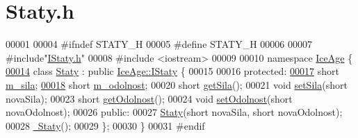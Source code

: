 \hypertarget{Staty_8h_source}{}\section{Staty.\+h}
\label{Staty_8h_source}

\begin{DoxyCode}
00001 
00004 \textcolor{preprocessor}{#ifndef STATY\_H}
00005 \textcolor{preprocessor}{#define STATY\_H}
00006 
00007 \textcolor{preprocessor}{#include"\hyperlink{IStaty_8h}{IStaty.h}"}
00008 \textcolor{preprocessor}{#include <iostream>}
00009 
00010 \textcolor{keyword}{namespace }\hyperlink{namespaceIceAge}{IceAge} \{
\hypertarget{Staty_8h_source.tex_l00014}{}\hyperlink{classIceAge_1_1Staty}{00014}     \textcolor{keyword}{class }\hyperlink{classIceAge_1_1Staty}{Staty} : \textcolor{keyword}{public} \hyperlink{classIceAge_1_1IStaty}{IceAge::IStaty} \{
00015 
00016     \textcolor{keyword}{protected}:
\hypertarget{Staty_8h_source.tex_l00017}{}\hyperlink{classIceAge_1_1Staty_a9ff580be9af5b83c9a26cbb031a39cce}{00017}         \textcolor{keywordtype}{short} \hyperlink{classIceAge_1_1Staty_a9ff580be9af5b83c9a26cbb031a39cce}{m\_sila};
\hypertarget{Staty_8h_source.tex_l00018}{}\hyperlink{classIceAge_1_1Staty_a71017d01cdc77192c6f70946b25a74e8}{00018}         \textcolor{keywordtype}{short} \hyperlink{classIceAge_1_1Staty_a71017d01cdc77192c6f70946b25a74e8}{m\_odolnost};
00020         \textcolor{keywordtype}{short} \hyperlink{classIceAge_1_1Staty_a2c8b38d3cfa305f5b5fab199894dd922}{getSila}();
00021         \textcolor{keywordtype}{void} \hyperlink{classIceAge_1_1Staty_a769be7c06fd2ab2bc7057f2689e6864c}{setSila}(\textcolor{keywordtype}{short} novaSila);
00023         \textcolor{keywordtype}{short} \hyperlink{classIceAge_1_1Staty_a142a0ec049584c8ea716b96d2b742b08}{getOdolnost}();
00024         \textcolor{keywordtype}{void} \hyperlink{classIceAge_1_1Staty_a14cd86c6d0d4ed7585ff5383aea5e6ef}{setOdolnost}(\textcolor{keywordtype}{short} novaOdolnost);
00026     \textcolor{keyword}{public}:
00027         \hyperlink{classIceAge_1_1Staty_a41482daadd8eab17ad41eab0233f98e4}{Staty}(\textcolor{keywordtype}{short} novaSila, \textcolor{keywordtype}{short} novaOdolnost);
00028         \hyperlink{classIceAge_1_1Staty_aa8ccf34e939618fdc60d9ceee5c1309e}{~Staty}();
00029     \};
00030 \}
00031 \textcolor{preprocessor}{#endif}
\end{DoxyCode}
